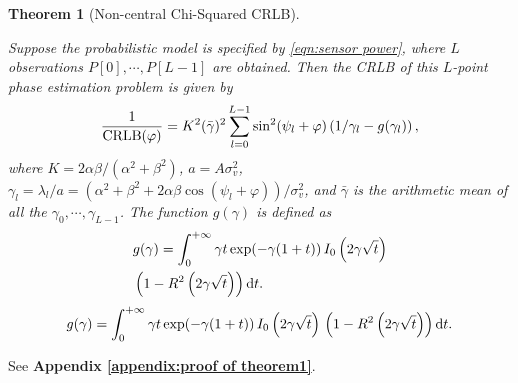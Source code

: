\documentclass[journal,twocolumn]{IEEEtran}
\newtheorem{theorem}{\bf Theorem}
\theoremstyle{nonumberplain}
\begin{document}
    \begin{theorem}[Non-central Chi-Squared CRLB] \label{thm:precise CRLB}\mbox{}\par
        Suppose the probabilistic model is specified by \eqref{eqn:sensor power}, where $L$ observations $P[0],\cdots,P[L-1]$ are obtained. Then the CRLB of this $L$-point phase estimation problem is given by
        \begin{equation}
            \frac{1}{{\rm CRLB}(\varphi)} = K^2(\bar{\gamma})^2 \sum_{l=0}^{L-1}\sin^2(\psi_l+\varphi)\left(1/\gamma_l-g(\gamma_l)\right),
            \label{eqn:precise_CRLB}
        \end{equation}
        where $K=2\alpha\beta/(\alpha^2+\beta^2)$, $a=A\sigma_v^2$, $\gamma_l=\lambda_l/a=\left(\alpha^2+\beta^2+2\alpha\beta \cos(\psi_l+\varphi)\right)/\sigma_v^2$, and $\bar{\gamma}$ is the arithmetic mean of all the $\gamma_0,\cdots,\gamma_{L-1}$. The function $g(\gamma)$ is defined as 
        \ifx\onecol\undefined
            \begin{equation}\label{eqn:precise_g_function}
                \begin{aligned}
                    & g(\gamma)  = \int_{0}^{+\infty}\gamma t \, {\rm exp}(-\gamma(1+t))\, I_0\left(2\gamma\sqrt{t}\right) \\
                    & \left(1-R^2\left(2\gamma\sqrt{t}\right)\right){\rm d}t.
                \end{aligned}
            \end{equation}
        \else 
            \begin{equation}
                g(\gamma)  = \int_{0}^{+\infty}\gamma t \, {\rm exp}(-\gamma(1+t))\, I_0\left(2\gamma\sqrt{t}\right)\,\left(1-R^2\left(2\gamma\sqrt{t}\right)\right){\rm d}t.
                \label{eqn:precise_g_function}
            \end{equation}
        \fi
    \end{theorem}
    \begin{IEEEproof}
        See {\bf Appendix \ref{appendix:proof of theorem1}}. 
    \end{IEEEproof}
\end{document}
